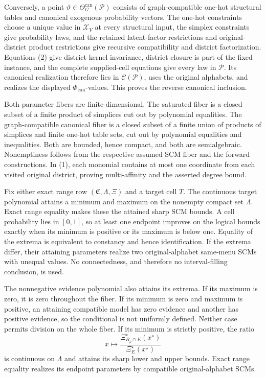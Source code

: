 Conversely, a point \(\vartheta\in\Theta_G^{\mathrm{can}}(\mathcal P)\) consists of graph-compatible one-hot structural tables and canonical exogenous probability vectors.  The one-hot constraints choose a unique value in \(\mathcal X_V\) at every structural input, the simplex constraints give probability laws, and the retained latent-factor restrictions and original-district product restrictions give recursive compatibility and district factorization.  Equations (2) give district-kernel invariance, district closure is part of the fixed instance, and the complete supplied-cell equations give every law in \(\mathcal P\).  Its canonical realization therefore lies in \(\mathcal C(\mathcal P)\), uses the original alphabets, and realizes the displayed \(\Phi_{\mathrm{can}}\)-values.  This proves the reverse canonical inclusion.

Both parameter fibers are finite-dimensional.  The saturated fiber is a closed subset of a finite product of simplices cut out by polynomial equalities.  The graph-compatible canonical fiber is a closed subset of a finite union of products of simplices and finite one-hot table sets, cut out by polynomial equalities and inequalities.  Both are bounded, hence compact, and both are semialgebraic.  Nonemptiness follows from the respective assumed SCM fiber and the forward constructions.  In (1), each monomial contains at most one coordinate from each visited original district, proving multi-affinity and the asserted degree bound.

Fix either exact range row \((\mathfrak C,\Lambda,\Xi)\) and a target cell \(T\).  The continuous target polynomial attains a minimum and maximum on the nonempty compact set \(\Lambda\).  Exact range equality makes these the attained sharp SCM bounds.  A cell probability lies in \([0,1]\), so at least one endpoint improves on the logical bounds exactly when its minimum is positive or its maximum is below one.  Equality of the extrema is equivalent to constancy and hence identification.  If the extrema differ, their attaining parameters realize two original-alphabet same-menu SCMs with unequal values.  No connectedness, and therefore no interval-filling conclusion, is used.

The nonnegative evidence polynomial also attains its extrema.  If its maximum is zero, it is zero throughout the fiber.  If its minimum is zero and maximum is positive, an attaining compatible model has zero evidence and another has positive evidence, so the conditional is not uniformly defined.  Neither case permits division on the whole fiber.  If its minimum is strictly positive, the ratio
\[
x\longmapsto
\frac{\Xi_{B_\rho\cap E}^\star(x^\star)}{\Xi_E^\star(x^\star)}
\tag{3}
\]
is continuous on \(\Lambda\) and attains its sharp lower and upper bounds.  Exact range equality realizes its endpoint parameters by compatible original-alphabet SCMs.

